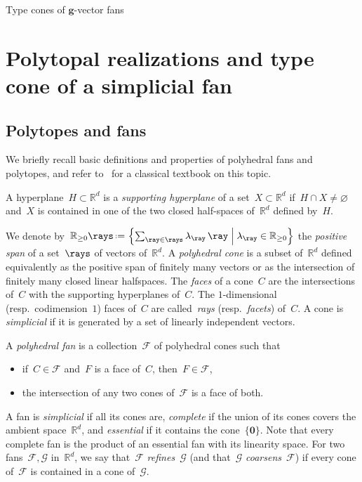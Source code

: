 \documentclass{amsart}
\makeatletter
\theoremstyle{definition}
\newcommand{\R}{\mathbb{R}} %
\renewcommand{\c}[1]{{\mathcal{#1}}} %
\renewcommand{\b}[1]{{\boldsymbol{#1}}} %
\newcommand{\set}[2]{\left\{ #1 \;\middle|\; #2 \right\}} %
\newcommand{\eqdef}{\mbox{\,\raisebox{0.2ex}{\scriptsize\ensuremath{\mathrm:}}\ensuremath{=}\,}} %
\newcommand{\darkblue}{\color{darkblue}} %
\newcommand{\defn}[1]{\textsl{\darkblue #1}} %
\newcommand{\Fan}{\mathcal{F}} %
\def\part{\@startsection{part}{1}%
\z@{.7\linespacing\@plus\linespacing}{.8\linespacing}%
{\LARGE\sffamily\centering}}
\makeatother
\begin{document}

\newpage
{}
\part{Type cones of $\b{g}$-vector fans}
\label{part:geometry}


\section{Polytopal realizations and type cone of a simplicial fan}
\label{sec:typeCone}


\subsection{Polytopes and fans}

We briefly recall basic definitions and properties of polyhedral fans and polytopes, and refer to~\cite{Ziegler-polytopes} for a classical textbook on this topic.

A hyperplane~$H \subset \R^d$ is a \defn{supporting hyperplane} of a set~$X \subset \R^d$ if~$H \cap X \ne \varnothing$ and~$X$ is contained in one of the two closed half-spaces of~$\R^d$ defined by~$H$.

We denote by~$\R_{\ge0}\rays \eqdef \set{\sum_{\ray \in \rays} \lambda_{\ray} \, \ray}{\lambda_{\ray} \in \R_{\ge0}}$ the \defn{positive span} of a set~$\rays$ of vectors of~$\R^d$.
A \defn{polyhedral cone} is a subset of~$\R^d$ defined equivalently as the positive span of finitely many vectors or as the intersection of finitely many closed linear halfspaces.
The \defn{faces} of a cone~$C$ are the intersections of~$C$ with the supporting hyperplanes of~$C$.
The $1$-dimensional (resp.~codimension~$1$) faces of~$C$ are called~\defn{rays} (resp.~\defn{facets}) of~$C$.
A cone is \defn{simplicial} if it is generated by a set of linearly independent vectors.

A \defn{polyhedral fan} is a collection~$\Fan$ of polyhedral cones such that
\begin{itemize}
\item if~$C \in \Fan$ and~$F$ is a face of~$C$, then~$F \in \Fan$,
\item the intersection of any two cones of~$\Fan$ is a face of both.
\end{itemize}
A fan is \defn{simplicial} if all its cones are, \defn{complete} if the union of its cones covers the ambient space~$\R^d$, and \defn{essential} if it contains the cone~$\{\b{0}\}$. Note that every complete fan is the product of an essential fan with its linearity space.
For two fans~$\Fan, \c{G}$ in~$\R^d$, we say that~$\Fan$ \defn{refines}~$\c{G}$ (and that~$\c{G}$ \defn{coarsens}~$\Fan$) if every cone of~$\Fan$ is contained in a cone of~$\c{G}$.
\end{document}
